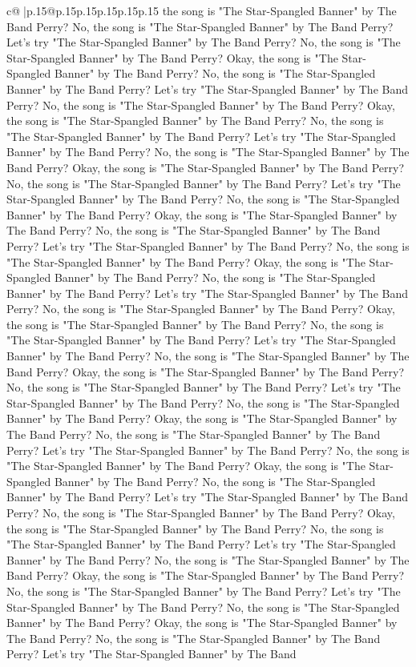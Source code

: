 \documentclass{article}
\begin{document}
{\begin{supertabular}{c@{$\;$}|p{.15\linewidth}@{}p{.15\linewidth}p{.15\linewidth}p{.15\linewidth}p{.15\linewidth}p{.15\linewidth}}
{{{the song is "The Star{-}Spangled Banner" by The Band Perry? No, the song is "The Star{-}Spangled Banner" by The Band Perry? Let's try "The Star{-}Spangled Banner" by The Band Perry? No, the song is "The Star{-}Spangled Banner" by The Band Perry? Okay, the song is "The Star{-}Spangled Banner" by The Band Perry? No, the song is "The Star{-}Spangled Banner" by The Band Perry? Let's try "The Star{-}Spangled Banner" by The Band Perry? No, the song is "The Star{-}Spangled Banner" by The Band Perry? Okay, the song is "The Star{-}Spangled Banner" by The Band Perry? No, the song is "The Star{-}Spangled Banner" by The Band Perry? Let's try "The Star{-}Spangled Banner" by The Band Perry? No, the song is "The Star{-}Spangled Banner" by The Band Perry? Okay, the song is "The Star{-}Spangled Banner" by The Band Perry? No, the song is "The Star{-}Spangled Banner" by The Band Perry? Let's try "The Star{-}Spangled Banner" by The Band Perry? No, the song is "The Star{-}Spangled Banner" by The Band Perry? Okay, the song is "The Star{-}Spangled Banner" by The Band Perry? No, the song is "The Star{-}Spangled Banner" by The Band Perry? Let's try "The Star{-}Spangled Banner" by The Band Perry? No, the song is "The Star{-}Spangled Banner" by The Band Perry? Okay, the song is "The Star{-}Spangled Banner" by The Band Perry? No, the song is "The Star{-}Spangled Banner" by The Band Perry? Let's try "The Star{-}Spangled Banner" by The Band Perry? No, the song is "The Star{-}Spangled Banner" by The Band Perry? Okay, the song is "The Star{-}Spangled Banner" by The Band Perry? No, the song is "The Star{-}Spangled Banner" by The Band Perry? Let's try "The Star{-}Spangled Banner" by The Band Perry? No, the song is "The Star{-}Spangled Banner" by The Band Perry? Okay, the song is "The Star{-}Spangled Banner" by The Band Perry? No, the song is "The Star{-}Spangled Banner" by The Band Perry? Let's try "The Star{-}Spangled Banner" by The Band Perry? No, the song is "The Star{-}Spangled Banner" by The Band Perry? Okay, the song is "The Star{-}Spangled Banner" by The Band Perry? No, the song is "The Star{-}Spangled Banner" by The Band Perry? Let's try "The Star{-}Spangled Banner" by The Band Perry? No, the song is "The Star{-}Spangled Banner" by The Band Perry? Okay, the song is "The Star{-}Spangled Banner" by The Band Perry? No, the song is "The Star{-}Spangled Banner" by The Band Perry? Let's try "The Star{-}Spangled Banner" by The Band Perry? No, the song is "The Star{-}Spangled Banner" by The Band Perry? Okay, the song is "The Star{-}Spangled Banner" by The Band Perry? No, the song is "The Star{-}Spangled Banner" by The Band Perry? Let's try "The Star{-}Spangled Banner" by The Band Perry? No, the song is "The Star{-}Spangled Banner" by The Band Perry? Okay, the song is "The Star{-}Spangled Banner" by The Band Perry? No, the song is "The Star{-}Spangled Banner" by The Band Perry? Let's try "The Star{-}Spangled Banner" by The Band Perry? No, the song is "The Star{-}Spangled Banner" by The Band Perry? Okay, the song is "The Star{-}Spangled Banner" by The Band Perry? No, the song is "The Star{-}Spangled Banner" by The Band Perry? Let's try "The Star{-}Spangled Banner" by The Band }}}
\end{supertabular}}
\end{document}
